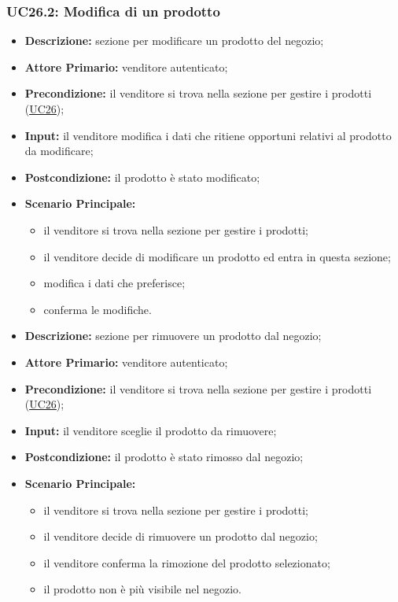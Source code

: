 \subsubsection{UC26.2: Modifica di un prodotto}
\label{sec:UC26.2}
\begin{itemize}
    \item \textbf{Descrizione:} sezione per modificare un prodotto del negozio;
    \item \textbf{Attore Primario:} venditore autenticato;
    \item \textbf{Precondizione:} il venditore si trova nella sezione per gestire i prodotti (\hyperref[sec:UC26]{\underline{UC26}});
    \item \textbf{Input:} il venditore modifica i dati che ritiene opportuni relativi al prodotto da modificare;
    \item \textbf{Postcondizione:} il prodotto è stato modificato;
    \item \textbf{Scenario Principale:}
          \begin{itemize}
              \item il venditore si trova nella sezione per gestire i prodotti;
              \item il venditore decide di modificare un prodotto ed entra in questa sezione;
              \item modifica i dati che preferisce;
              \item conferma le modifiche.
          \end{itemize}
\end{itemize}
\label{sec:UC26.3}
\begin{itemize}
    \item \textbf{Descrizione:} sezione per rimuovere un prodotto dal negozio;
    \item \textbf{Attore Primario:} venditore autenticato;
    \item \textbf{Precondizione:} il venditore si trova nella sezione per gestire i prodotti (\hyperref[sec:UC26]{\underline{UC26}});
    \item \textbf{Input:} il venditore sceglie il prodotto da rimuovere;
    \item \textbf{Postcondizione:} il prodotto è stato rimosso dal negozio;
    \item \textbf{Scenario Principale:}
          \begin{itemize}
              \item il venditore si trova nella sezione per gestire i prodotti;
              \item il venditore decide di rimuovere un prodotto dal negozio;
              \item il venditore conferma la rimozione del prodotto selezionato;
              \item il prodotto non è più visibile nel negozio.
          \end{itemize}
\end{itemize}